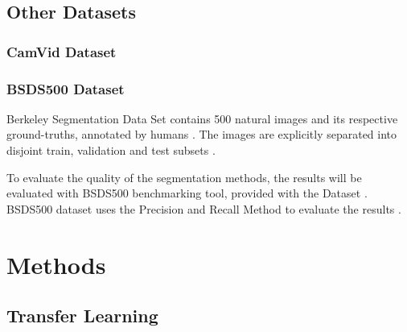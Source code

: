 \documentclass[10pt,twocolumn,letterpaper]{article}
\begin{document}
\subsection{Other Datasets} \label{ssec:other_datasets}

\subsubsection{CamVid Dataset} \label{sssec:camvid_datasets}

\subsubsection{BSDS500 Dataset} \label{sssec:bsds_dataset}

Berkeley Segmentation Data Set contains 500 natural images and its respective ground-truths, annotated by humans \cite{BSDS500}. The images are explicitly separated into disjoint train, validation and test subsets \cite{BSDS500}.

To evaluate the quality of the segmentation methods, the results will be evaluated with BSDS500 benchmarking tool, provided with the Dataset \cite{BSDS500}. BSDS500 dataset uses the Precision and Recall Method to evaluate the results \cite{BSDS500}.


\section{Methods} \label{sec:methods}


\subsection{Transfer Learning} \label{ssec:transfer_learning}
\end{document}
